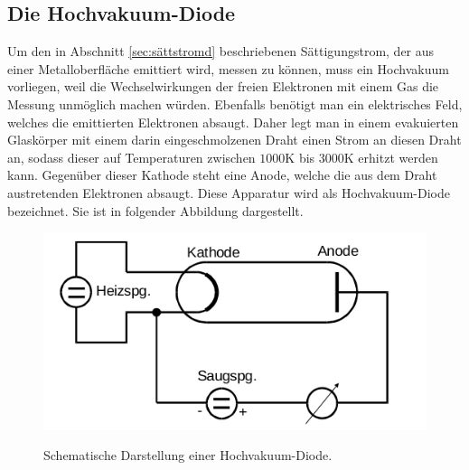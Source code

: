 \subsection{Die Hochvakuum-Diode}
\label{sec:hochvak}
Um den in Abschnitt \ref{sec:sättstromd} beschriebenen Sättigungstrom, der aus
einer Metalloberfläche emittiert wird, messen zu können, muss ein Hochvakuum
vorliegen, weil die Wechselwirkungen der freien Elektronen mit einem Gas die
Messung unmöglich machen würden. Ebenfalls benötigt man ein elektrisches Feld,
welches die emittierten Elektronen absaugt. Daher legt man in einem evakuierten
Glaskörper mit einem darin eingeschmolzenen Draht einen Strom an diesen Draht an,
sodass dieser auf Temperaturen zwischen $1000 \si{\kelvin}$ bis $3000 \si{\kelvin}$
erhitzt werden kann. Gegenüber dieser Kathode steht eine Anode, welche die aus
dem Draht austretenden Elektronen absaugt. Diese Apparatur wird als
Hochvakuum-Diode bezeichnet. Sie ist in folgender Abbildung dargestellt.
\begin{figure}[H]
  \centering
  \includegraphics[scale=0.5]{content/hochvakuumdiode.png}
  \label{fig:hochvakuumd}
  \caption{Schematische Darstellung einer Hochvakuum-Diode.}
\end{figure}
\noindent

